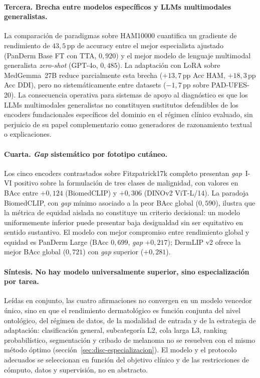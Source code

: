 \paragraph{Tercera. Brecha entre modelos específicos y LLMs
multimodales generalistas.}
La comparación de paradigmas sobre HAM10000 cuantifica un
gradiente de rendimiento de $43{,}5$\,pp de accuracy entre el
mejor especialista ajustado (PanDerm Base FT con TTA, $0{,}920$) y el
mejor modelo de lenguaje multimodal generalista
\emph{zero-shot} (GPT-4o, $0{,}485$). La adaptación con LoRA
sobre MedGemma~27B reduce parcialmente esta brecha
($+13{,}7$\,pp Acc HAM, $+18{,}3$\,pp Acc DDI), pero no
sistemáticamente entre datasets ($-1{,}7$\,pp sobre
PAD-UFES-20). La consecuencia operativa para sistemas de apoyo al
diagnóstico es que los LLMs multimodales generalistas no
constituyen sustitutos defendibles de los encoders fundacionales
específicos del dominio en el régimen clínico evaluado, sin
perjuicio de su papel complementario como generadores de
razonamiento textual o explicaciones.

\paragraph{Cuarta. \emph{Gap} sistemático por fototipo cutáneo.}
Los cinco encoders contrastados sobre Fitzpatrick17k completo
presentan \emph{gap}~I-VI positivo sobre la formulación de tres
clases de malignidad, con valores en BAcc entre $+0{,}124$
(BiomedCLIP) y $+0{,}306$ (DINOv2 ViT-L/14). La paradoja
BiomedCLIP, con \emph{gap} mínimo asociado a la peor BAcc global
($0{,}590$), ilustra que la métrica de equidad aislada no
constituye un criterio decisional: un modelo uniformemente inferior
puede presentar baja desigualdad sin ser equitativo en sentido
sustantivo. El modelo con mejor compromiso entre rendimiento global
y equidad es PanDerm Large (BAcc $0{,}699$, \emph{gap}
$+0{,}217$); DermLIP v2 ofrece la mejor BAcc global
($0{,}721$) con \emph{gap} superior ($+0{,}281$).

\paragraph{Síntesis. No hay modelo universalmente superior, sino
especialización por tarea.}
Leídas en conjunto, las cuatro afirmaciones no convergen en un modelo
vencedor único, sino en que el rendimiento dermatológico es función
conjunta del nivel ontológico, del régimen de datos, de la modalidad de
entrada y de la estrategia de adaptación: clasificación general,
subcategoría L2, cola larga L3, ranking probabilístico, segmentación y
cribado de melanoma no se resuelven con el mismo método óptimo
(sección~\ref{sec:disc-especializacion}). El modelo y el protocolo
adecuados se seleccionan en función del objetivo clínico y de las
restricciones de cómputo, datos y supervisión, no en abstracto.

